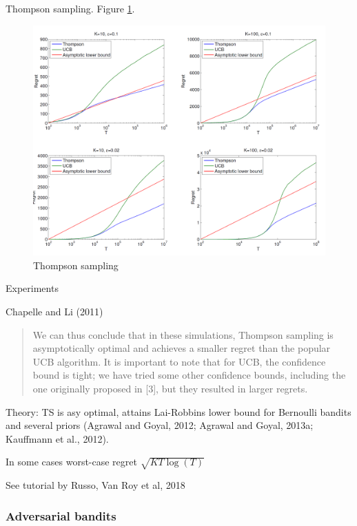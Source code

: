 \documentclass[english]{article}
\begin{document}
\item {Thompson sampling}. Figure \ref{Thompson sampling}.
\begin{figure}
\begin{center}
\includegraphics[width=0.55\paperwidth]{th}
    \caption{Thompson sampling}
    \label{Thompson sampling}
\end{center}
\end{figure}



\item {Experiments}
\bitem
\item Chapelle and Li (2011)
\begin{quote}
We can thus conclude that in these simulations, Thompson sampling is asymptotically optimal and
achieves a smaller regret than the popular UCB algorithm. It is important to note that for UCB,
the confidence bound is tight; we have tried some other confidence bounds, including the one
originally proposed in [3], but they resulted in larger regrets.
\end{quote}
\item Theory: TS is asy optimal, attains Lai-Robbins lower bound for Bernoulli bandits and several priors (Agrawal and Goyal, 2012; Agrawal and Goyal,
2013a; Kauffmann et al., 2012).
\item In some cases worst-case regret $\sqrt{KT\log(T)}$
\item See tutorial by Russo, Van Roy et al, 2018
\eitem


\eenum

\subsubsection{Adversarial bandits}
\end{document}

